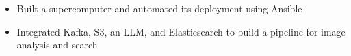 \begin{itemize}
  \item Built a supercomputer and automated its deployment using Ansible
  \item Integrated Kafka, S3, an LLM, and Elasticsearch to build a pipeline for image analysis and search
\end{itemize}
\vspace{4pt}

